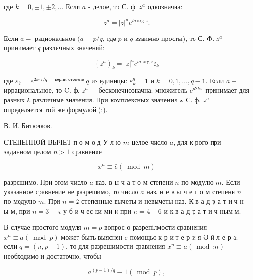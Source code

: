 \documentclass[10pt]{article}
\begin{document}
где $k=0, \pm 1, \pm 2, \ldots$ Если $a$ - делое, то С. ф. $z^{a}$ однозначна:



\[

z^{a}=|z|^{a} e^{i a \arg z} .

\]



Если $a-$ рациональное $(a=p / q$, где $p$ и $q$ взаимно просты), то С. Ф. $z^{a}$ принимает $q$ различных значений:



\[

\left(z^{a}\right)_{k}=|z|^{a} e^{i a \arg z} \varepsilon_{k}

\]



где $\varepsilon_{k}=e^{2 k \pi i / q-\text { корни } е т е п е н и ~} q$ из единицы: $\varepsilon_{k}^{q}=1$ и $k=0,1, \ldots, q-1$. Если $a-$ иррациональное, то C. ф. $z^{a}-$ бесконечнозначна: множитель $e^{a 2 k \pi}$ принимает для разных $k$ различные значения. При комплексных значения $\mathbf{x}$ С. ф. $z^{a}$ определяется той же формулой (:).



В. И. Битючков.



СТЕПЕННОЙ ВЫЧЕТ п о м о д У л ю $m$-целое число $a$, для к-рого при заданном целом $n>1$ сравнение



\[

x^{n} \equiv \bar{a}(\bmod m)

\]



разрешимо. При этом число $a$ наз. в ы ч а т о м степени $n$ по модулю $m$. Если указанное сравнение не разрешимо, то число $a$ наз. н е в ы ч е т о м степени $n$ по модулю $m$. При $n=2$ степенные вычеты и невычеты наз. К в а д р а т и ч н ы м, при $n=3-\kappa$ у б и ч ес ки ми и при $n=4-6$ и к в а д р а т и ч ным м.



В случае простого модуля $m=p$ вопрос о разрепілмости сравнения $x^{n} \equiv a(\bmod p)$ может быть выяснен c помощьо к р и т е р и я Ә й л е р а: если $q=(n, p-1)$, то для разрешимости сравнения $x^{n} \equiv a(\bmod m)$ необходимо и достаточно, чтобы



\[

a^{(p-1) / q} \equiv 1(\bmod p),

\]
\end{document}
